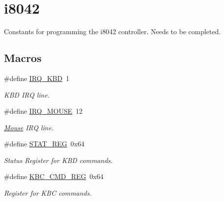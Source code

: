 \hypertarget{group__i8042}{}\section{i8042}
\label{group__i8042}


Constants for programming the i8042 controller. Needs to be completed.  


\subsection*{Macros}
\begin{DoxyCompactItemize}
\item 
\hypertarget{group__i8042_ga0b7569cda71298859ffb6ea55c03a36a}{}\label{group__i8042_ga0b7569cda71298859ffb6ea55c03a36a} 
\#define \hyperlink{group__i8042_ga0b7569cda71298859ffb6ea55c03a36a}{I\+R\+Q\+\_\+\+K\+BD}~1
\begin{DoxyCompactList}\small\item\em K\+BD I\+RQ line. \end{DoxyCompactList}\item 
\hypertarget{group__i8042_ga32ffe73ffc337fbec467ea02948591af}{}\label{group__i8042_ga32ffe73ffc337fbec467ea02948591af} 
\#define \hyperlink{group__i8042_ga32ffe73ffc337fbec467ea02948591af}{I\+R\+Q\+\_\+\+M\+O\+U\+SE}~12
\begin{DoxyCompactList}\small\item\em \hyperlink{struct_mouse}{Mouse} I\+RQ line. \end{DoxyCompactList}\item 
\hypertarget{group__i8042_ga89c4d098b53809674457b1660b1af780}{}\label{group__i8042_ga89c4d098b53809674457b1660b1af780} 
\#define \hyperlink{group__i8042_ga89c4d098b53809674457b1660b1af780}{S\+T\+A\+T\+\_\+\+R\+EG}~0x64
\begin{DoxyCompactList}\small\item\em Status Register for K\+BD commands. \end{DoxyCompactList}\item 
\hypertarget{group__i8042_ga6d57c7927a10f638c83046b52c8caac9}{}\label{group__i8042_ga6d57c7927a10f638c83046b52c8caac9} 
\#define \hyperlink{group__i8042_ga6d57c7927a10f638c83046b52c8caac9}{K\+B\+C\+\_\+\+C\+M\+D\+\_\+\+R\+EG}~0x64
\begin{DoxyCompactList}\small\item\em Register for K\+BC commands. \end{DoxyCompactList}\item 

\end{DoxyCompactItemize}
